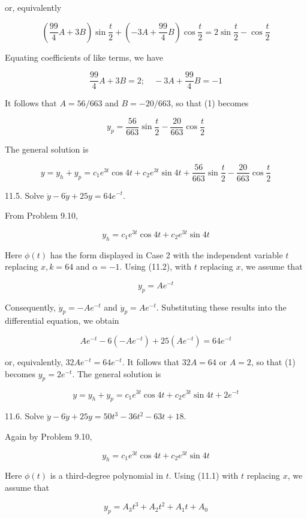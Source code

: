 \documentclass[10pt]{article}
\begin{document}
or, equivalently

$$
\left(\frac{99}{4} A+3 B\right) \sin \frac{t}{2}+\left(-3 A+\frac{99}{4} B\right) \cos \frac{t}{2}=2 \sin \frac{t}{2}-\cos \frac{t}{2}
$$

Equating coefficients of like terms, we have

$$
\frac{99}{4} A+3 B=2 ; \quad-3 A+\frac{99}{4} B=-1
$$

It follows that $A=56 / 663$ and $B=-20 / 663$, so that (1) becomes

$$
y_{p}=\frac{56}{663} \sin \frac{t}{2}-\frac{20}{663} \cos \frac{t}{2}
$$

The general solution is

$$
y=y_{h}+y_{p}=c_{1} e^{3 t} \cos 4 t+c_{2} e^{3 t} \sin 4 t+\frac{56}{663} \sin \frac{t}{2}-\frac{20}{663} \cos \frac{t}{2}
$$

11.5. Solve $\ddot{y}-6 \dot{y}+25 y=64 e^{-t}$.

From Problem 9.10,

$$
y_{h}=c_{1} e^{3 t} \cos 4 t+c_{2} e^{3 t} \sin 4 t
$$

Here $\phi(t)$ has the form displayed in Case 2 with the independent variable $t$ replacing $x, k=64$ and $\alpha=-1$. Using (11.2), with $t$ replacing $x$, we assume that


\begin{equation*}
y_{p}=A e^{-t} \tag{1}
\end{equation*}


Consequently, $\dot{y}_{p}=-A e^{-t}$ and $\ddot{y}_{p}=A e^{-t}$. Substituting these results into the differential equation, we obtain

$$
A e^{-t}-6\left(-A e^{-t}\right)+25\left(A e^{-t}\right)=64 e^{-t}
$$

or, equivalently, $32 A e^{-t}=64 e^{-t}$. It follows that $32 A=64$ or $A=2$, so that (1) becomes $y_{p}=2 e^{-t}$. The general solution is

$$
y=y_{h}+y_{p}=c_{1} e^{3 t} \cos 4 t+c_{2} e^{3 t} \sin 4 t+2 e^{-t}
$$

11.6. Solve $\ddot{y}-6 \dot{y}+25 y=50 t^{3}-36 t^{2}-63 t+18$.

Again by Problem 9.10,

$$
y_{h}=c_{1} e^{3 t} \cos 4 t+c_{2} e^{3 t} \sin 4 t
$$

Here $\phi(t)$ is a third-degree polynomial in $t$. Using (11.1) with $t$ replacing $x$, we assume that


\begin{equation*}
y_{p}=A_{3} t^{3}+A_{2} t^{2}+A_{1} t+A_{0} \tag{1}
\end{equation*}
\end{document}
